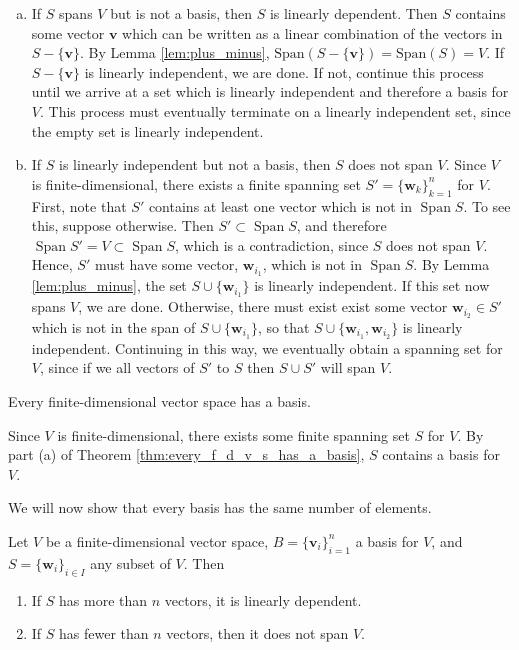 \documentclass[12pt,letterpaper,reqno]{article}
\numberwithin{equation}{section}
\newcommand{\bv}{\mathbf{v}}
\newcommand{\bw}{\mathbf{w}}
\DeclareMathOperator{\Span}{Span}
\begin{document}
\begin{pf}
	\begin{enumerate}[(a)]
		\item If $S$ spans $V$ but is not a basis, then $S$ is linearly dependent. Then $S$ contains some vector $\bv$ which can be written as a linear combination of the vectors in $S-\{\bv\}$. By Lemma \ref{lem:plus_minus}, $\text{Span}(S-\{\bv\})=\text{Span}(S)=V$. If $S-\{\bv\}$ is linearly independent, we are done. If not, continue this process until we arrive at a set which is linearly independent and therefore a basis for $V$. This process must eventually terminate on a linearly independent set, since the empty set is linearly independent.
		\item If $S$ is linearly independent but not a basis, then $S$ does not span $V$. Since $V$ is finite-dimensional, there exists a finite spanning set $S'=\{\mathbf{w}_k\}_{k=1}^n$ for $V$. First, note that $S'$ contains at least one vector which is not in $\Span S$. To see this, suppose otherwise. Then $S' \subset \Span S$, and therefore $\Span S'=V \subset \Span S$, which is a contradiction, since $S$ does not span $V$. Hence, $S'$ must have some vector, $\mathbf{w}_{i_1}$, which is not in $\Span S$. By Lemma \ref{lem:plus_minus}, the set $S \cup \{\mathbf{w}_{i_1}\}$ is linearly independent. If this set now spans $V$, we are done. Otherwise, there must exist exist some vector $\mathbf{w}_{i_2} \in S'$ which is not in the span of $S \cup \{\mathbf{w}_{i_1}\}$, so that $S \cup \{\mathbf{w}_{i_1},\mathbf{w}_{i_2}\}$ is linearly independent. Continuing in this way, we eventually obtain a spanning set for $V$, since if we all vectors of $S'$ to $S$ then $S \cup S'$ will span $V$.
			\end{enumerate}
\end{pf}

\begin{cor}
	Every finite-dimensional vector space has a basis.
\end{cor}

\begin{pf}
	Since $V$ is finite-dimensional, there exists some finite spanning set $S$ for $V$. By part (a) of Theorem \ref{thm:every_f_d_v_s_has_a_basis}, $S$ contains a basis for $V$.
\end{pf}

We will now show that every basis has the same number of elements.

\begin{thm}
	Let $V$ be a finite-dimensional vector space, $B=\{\bv_i\}_{i=1}^n$ a basis for $V$, and $S=\{\bw_i\}_{i \in I}$ any subset of $V$. Then
	\begin{enumerate}
		\item If $S$ has more than $n$ vectors, it is linearly dependent.
		\item If $S$ has fewer than $n$ vectors, then it does not span $V$.
	\end{enumerate}
\end{thm}
\end{document}
